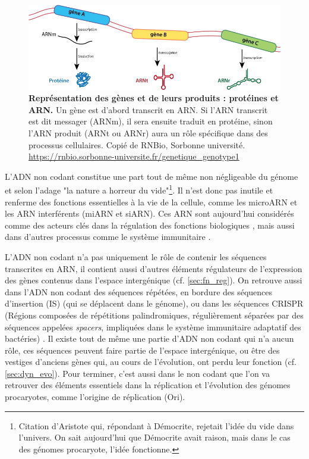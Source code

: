 \begin{figure}[htbp]
    \centering
    \includegraphics[width=\linewidth]{images/gene2prot.jpg}
    \caption[Représentation des gènes et de leurs produits]{\textbf{Représentation des gènes et de leurs produits : protéines et ARN.} Un gène est d'abord transcrit en ARN. Si l'ARN transcrit est dit messager (ARNm), il sera ensuite traduit en protéine, sinon l'ARN produit (ARNt ou ARNr) aura un rôle spécifique dans des processus cellulaires. Copié de RNBio, Sorbonne université. \url{https://rnbio.sorbonne-universite.fr/genetique_genotype1}}
    \label{fig:gene2prod}
\end{figure}

L'ADN non codant constitue une part tout de même non négligeable du génome et selon l'adage "la nature a horreur du vide"\footnote{Citation d'Aristote qui, répondant à Démocrite, rejetait l’idée du vide dans l’univers. On sait aujourd'hui que Démocrite avait raison, mais dans le cas des génomes procaryote, l'idée fonctionne.}. Il n'est donc pas inutile et renferme des fonctions essentielles à la vie de la cellule, comme les microARN et les ARN interférents (miARN et siARN). Ces ARN sont aujourd'hui considérés comme des acteurs clés dans la régulation des fonctions biologiques \cite{backofen_bioinformatics_2014,watkins_regulatory_2019}, mais aussi dans d'autres processus comme le système immunitaire \cite{bobadilla_ugarte_argonaute_2023}.

L'ADN non codant n'a pas uniquement le rôle de contenir les séquences transcrites en ARN, il contient aussi d'autres éléments régulateurs de l'expression des gènes contenus dans l'espace intergénique (cf. \autoref{sec:fn_reg}). On retrouve aussi dans l'ADN non codant des séquences répétées, en bordure des séquences d'insertion (IS) (qui se déplacent dans le génome), ou dans les séquences CRISPR (Régions composées de répétitions palindromiques, régulièrement séparées par des séquences appelées \textit{spacers}, impliquées dans le système immunitaire adaptatif des bactéries) \cite{jansen_identification_2002,bolotin_clustered_2005}. Il existe tout de même une partie d'ADN non codant qui n'a aucun rôle, ces séquences peuvent faire partie de l'espace intergénique, ou être des vestiges d'anciens gènes qui, au cours de l'évolution, ont perdu leur fonction (cf. \autoref{sec:dyn_evo}). Pour terminer, c'est aussi dans le non codant que l'on va retrouver des éléments essentiels dans la réplication et l'évolution des génomes procaryotes, comme l'origine de réplication (Ori).

